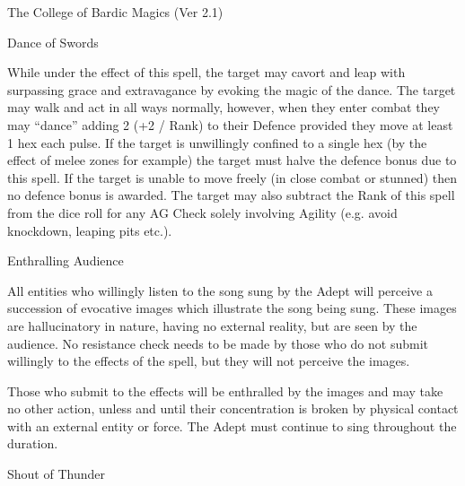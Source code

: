 \begin{Chapter}{The College of Bardic Magics (Ver 2.1)}
\begin{spell}[S-5]{Dance of Swords}
\begin{effects}
While under the effect of this spell, the target may cavort and leap
with surpassing grace and extravagance by evoking the magic of the
dance.  The target may walk and act in all ways normally, however,
when they enter combat they may “dance” adding 2 (+2 / Rank) to their
Defence provided they move at least 1 hex each pulse. If the target is
unwillingly confined to a single hex (by the effect of melee zones for
example) the target must halve the defence bonus due to this spell.
If the target is unable to move freely (in close combat or stunned)
then no defence bonus is awarded. The target may also subtract the
Rank of this spell from the dice roll for any AG Check solely
involving Agility (e.g. avoid knockdown, leaping pits etc.).
\end{effects}
\end{spell}

\begin{spell}[S-6]{Enthralling Audience}

\begin{effects}
All entities who willingly listen to the song sung by the Adept will
perceive a succession of evocative images which illustrate the song
being sung.  These images are hallucinatory in nature, having no
external reality, but are seen by the audience. No resistance check
needs to be made by those who do not submit willingly to the effects
of the spell, but they will not perceive the images.

Those who submit to the effects will be enthralled by the images and
may take no other action, unless and until their concentration is
broken by physical contact with an external entity or force. The Adept
must continue to sing throughout the duration.
\end{effects}
\end{spell}

\begin{spell}[S-7]{Shout of Thunder}


\end{spell}
\end{Chapter}
